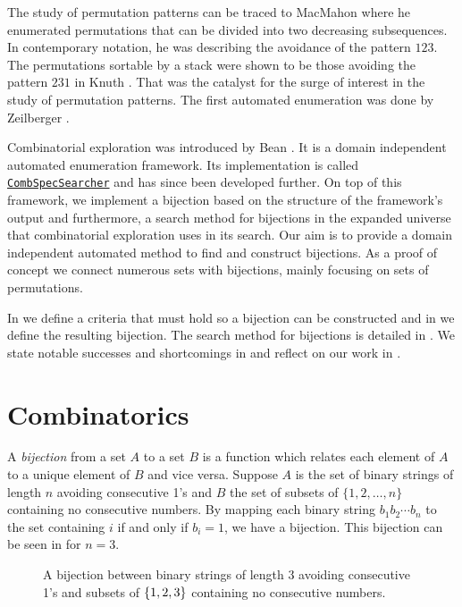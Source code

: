 \label{ch:introduction}
The study of permutation patterns can be traced to MacMahon \cite{MacMahon} where he enumerated permutations that can be divided into two decreasing subsequences. In contemporary notation, he was describing the avoidance of the pattern $123$. The permutations sortable by a stack were shown to be those avoiding the pattern $231$ in Knuth \cite{knuth:aocp1}. That was the catalyst for the surge of interest in the study of permutation patterns. The first automated enumeration was done by Zeilberger \cite{Zeilberger1998EnumerationSA}.

Combinatorial exploration was introduced by Bean \cite{BeanPhd:phd}. It is a domain independent automated enumeration framework. Its implementation is called \href{https://github.com/PermutaTriangle/comb_spec_searcher}{\texttt{CombSpecSearcher}} and has since been developed further. On top of this framework, we implement a bijection based on the structure of the framework's output and furthermore, a search method for bijections in the expanded universe that combinatorial exploration uses in its search. Our aim is to provide a domain independent automated method to find and construct bijections. As a proof of concept we connect numerous sets with bijections, mainly focusing on sets of permutations.

In  we define a criteria that must hold so a bijection can be constructed and in  we define the resulting bijection. The search method for bijections is detailed in . We state notable successes and shortcomings in  and reflect on our work in .

\section{Combinatorics\label{sec:combinatorics}}
A \emph{bijection} from a set $A$ to a set $B$ is a function which relates each element of $A$ to a unique element of $B$ and vice versa. Suppose $A$ is the set of binary strings of length $n$ avoiding consecutive 1's and $B$ the set of subsets of $\{1,2,\ldots,n\}$ containing no consecutive numbers. By mapping each binary string $b_1b_2\dotsm b_n$ to the set containing $i$ if and only if $b_i=1$, we have a bijection. This bijection can be seen in  for $n=3$.

\begin{figure}[ht!]
    \centering
    
    \caption{A bijection between binary strings of length 3 avoiding consecutive 1's and subsets of $\left\{1,2,3\right\}$ containing no consecutive numbers.}
    \label{fig:bijection_example}
\end{figure}

